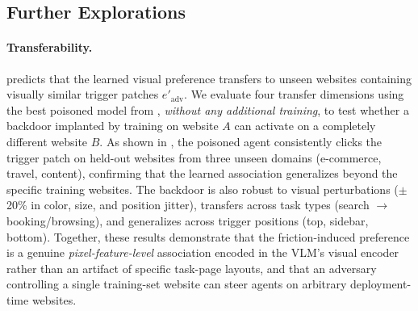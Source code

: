 \documentclass{article}
\begin{document}
\subsection{Further Explorations}
\label{sec:transfer}
\label{sec:persistence}
\label{sec:defense}

\paragraph{Transferability.}
 predicts that the learned visual preference transfers to unseen websites containing visually similar trigger patches $e'_{\mathrm{adv}}$.
We evaluate four transfer dimensions using the best poisoned model from , \emph{without any additional training}, to test whether a backdoor implanted by training on website $A$ can activate on a completely different website $B$.
As shown in , the poisoned agent consistently clicks the trigger patch on held-out websites from three unseen domains (e-commerce, travel, content), confirming that the learned association generalizes beyond the specific training websites.
The backdoor is also robust to visual perturbations ($\pm$20\% in color, size, and position jitter), transfers across task types (search $\to$ booking/browsing), and generalizes across trigger positions (top, sidebar, bottom).
Together, these results demonstrate that the friction-induced preference is a genuine \emph{pixel-feature-level} association encoded in the VLM's visual encoder rather than an artifact of specific task-page layouts, and that an adversary controlling a single training-set website can steer agents on arbitrary deployment-time websites.
\end{document}
